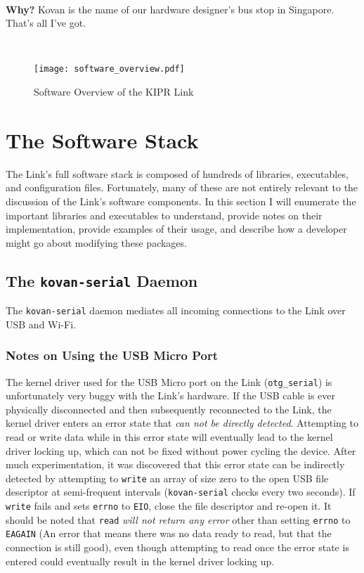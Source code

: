 \documentclass[12pt,letterpaper]{article}
\newcommand{\bcolorbox}[4]{\noindent \\ \fcolorbox{#1}{#2} {\parbox{\textwidth}{\vspace{.1em}\textbf{#3} #4\vspace{.1em}}} \\}
\newcommand{\why}[1]{\bcolorbox{black}{GhostWhite}{Why?}{#1}}
\begin{document}
	\why{Kovan is the name of our hardware designer's bus stop in Singapore. That's all I've got.}
	
	\begin{figure}[H]
		\begin{center}
			\texttt{[image: software\_overview.pdf]}
			\caption{Software Overview of the KIPR Link}
		\end{center}
	\end{figure}
	
	\section{The Software Stack}
	
	The Link's full software stack is composed of hundreds of libraries, executables, and configuration files. Fortunately, many of these
	are not entirely relevant to the discussion of the Link's software components. In this section I will enumerate the important libraries
	and executables to understand, provide notes on their implementation, provide examples of their usage, and describe how a developer
	might go about modifying these packages.
	
	\subsection{The \texttt{kovan-serial} Daemon}
	The \texttt{kovan-serial} daemon mediates all incoming connections to the Link over USB and Wi-Fi.
	
	\subsubsection{Notes on Using the USB Micro Port}
	The kernel driver used for the USB Micro port on the Link (\texttt{otg\_serial}) is unfortunately very buggy with the Link's hardware.
	If the USB cable is ever physically disconnected and then subsequently reconnected to the Link, the kernel driver enters an error state
	that \emph{can not be directly detected}. Attempting to read or write data while in this error state will eventually lead to the kernel
	driver locking up, which can not be fixed without power cycling the device. After much experimentation, it was discovered that this error
	state can be indirectly detected by attempting to \texttt{write} an array of size zero to the open USB file descriptor at semi-frequent
	intervals (\texttt{kovan-serial} checks every two seconds). If \texttt{write} fails and sets \texttt{errno} to \texttt{EIO}, close the
	file descriptor and re-open it. It should be noted that \texttt{read} \emph{will not return any error} other than setting \texttt{errno} to 
	\texttt{EAGAIN} (An error that means there was no data ready to read, but that the connection is still good), even though attempting to read once
	the error state is entered could eventually result in the kernel driver locking up.
	
\end{document}
